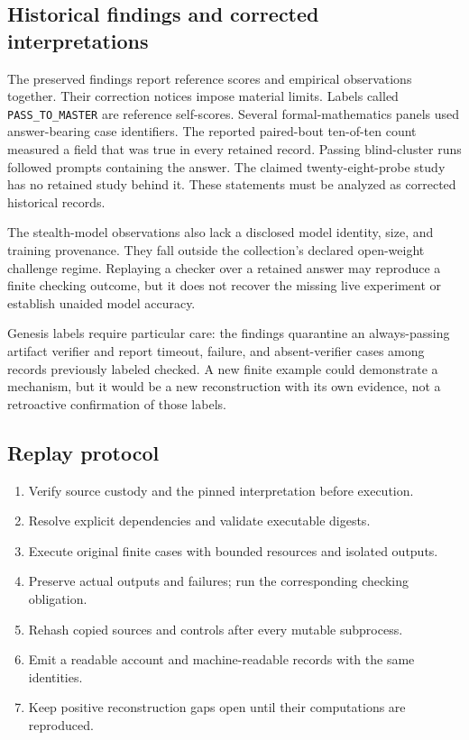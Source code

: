 \documentclass[
  11pt,
]{article}
\providecommand{\tightlist}{%
  \setlength{\itemsep}{0pt}\setlength{\parskip}{0pt}}
\begin{document}
\subsection{Historical findings and corrected
interpretations}\label{historical-findings-and-corrected-interpretations}

The preserved findings report reference scores and empirical
observations together. Their correction notices impose material limits.
Labels called \texttt{PASS\_\allowbreak{}TO\_\allowbreak{}MASTER} are
reference self-scores. Several formal-mathematics panels used
answer-bearing case identifiers. The reported paired-bout ten-of-ten
count measured a field that was true in every retained record. Passing
blind-cluster runs followed prompts containing the answer. The claimed
twenty-eight-probe study has no retained study behind it. These
statements must be analyzed as corrected historical records.

The stealth-model observations also lack a disclosed model identity,
size, and training provenance. They fall outside the collection's
declared open-weight challenge regime. Replaying a checker over a
retained answer may reproduce a finite checking outcome, but it does not
recover the missing live experiment or establish unaided model accuracy.

Genesis labels require particular care: the findings quarantine an
always-passing artifact verifier and report timeout, failure, and
absent-verifier cases among records previously labeled checked. A new
finite example could demonstrate a mechanism, but it would be a new
reconstruction with its own evidence, not a retroactive confirmation of
those labels.

\subsection{Replay protocol}\label{replay-protocol}

\begin{enumerate}
\def\labelenumi{\arabic{enumi}.}
\tightlist
\item
  Verify source custody and the pinned interpretation before execution.
\item
  Resolve explicit dependencies and validate executable digests.
\item
  Execute original finite cases with bounded resources and isolated
  outputs.
\item
  Preserve actual outputs and failures; run the corresponding checking
  obligation.
\item
  Rehash copied sources and controls after every mutable subprocess.
\item
  Emit a readable account and machine-readable records with the same
  identities.
\item
  Keep positive reconstruction gaps open until their computations are
  reproduced.
\end{enumerate}
\end{document}
